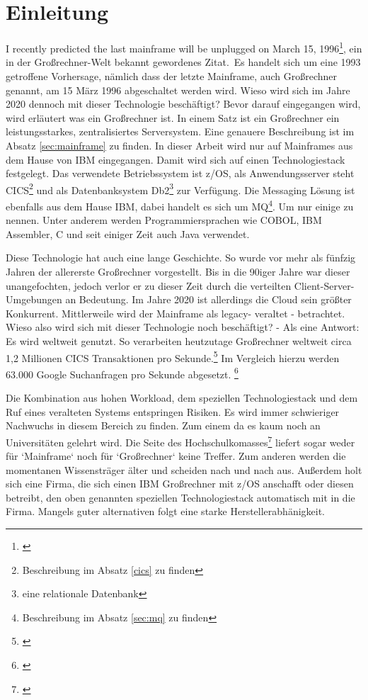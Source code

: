 \chapter{Einleitung}\label{ch:einleitung}
\glqq I recently predicted the last mainframe will be unplugged on March 15, 1996\grqq \footnote{\cite{Alsop.1993}}, ein in der Großrechner-Welt bekannt gewordenes Zitat.\
Es handelt sich um eine 1993 getroffene Vorhersage, nämlich dass der letzte Mainframe, auch Großrechner genannt, am 15 März 1996 abgeschaltet werden wird.
Wieso wird sich im Jahre 2020 dennoch mit dieser Technologie beschäftigt?
Bevor darauf eingegangen wird, wird erläutert was ein Großrechner ist.
In einem Satz ist ein Großrechner ein leistungsstarkes, zentralisiertes Serversystem.
Eine genauere Beschreibung ist im Absatz \ref{sec:mainframe} zu finden.
In dieser Arbeit wird nur auf Mainframes aus dem Hause von IBM eingegangen.
Damit wird sich auf einen Technologiestack festgelegt.
Das verwendete Betriebssystem ist z/OS, als Anwendungsserver steht CICS\footnote{Beschreibung im Absatz \ref{cics} zu finden} und als Datenbanksystem Db2\footnote{eine relationale Datenbank} zur Verfügung.
Die Messaging Lösung ist ebenfalls aus dem Hause IBM, dabei handelt es sich um MQ\footnote{Beschreibung im Absatz \ref{sec:mq} zu finden}.
Um nur einige zu nennen.
Unter anderem werden Programmiersprachen wie COBOL, IBM Assembler, C und seit einiger Zeit auch Java verwendet.

Diese Technologie hat auch eine lange Geschichte.
So wurde vor mehr als fünfzig Jahren der allererste Großrechner vorgestellt.
Bis in die 90iger Jahre war dieser unangefochten, jedoch verlor er zu dieser Zeit durch die verteilten Client-Server-Umgebungen an Bedeutung.
Im Jahre 2020 ist allerdings die Cloud sein größter Konkurrent.
Mittlerweile wird der Mainframe als \glqq  legacy\grqq{}- veraltet - betrachtet.
Wieso also wird sich mit dieser Technologie noch beschäftigt? - Als eine Antwort: Es wird weltweit genutzt.
So verarbeiten heutzutage Großrechner weltweit circa 1,2 Millionen CICS Transaktionen pro Sekunde.\footnote{\cite{IBM.2019}}
Im Vergleich hierzu werden 63.000 Google Suchanfragen pro Sekunde abgesetzt. \footnote{\cite{Sullivan.2016}}

Die Kombination aus hohen Workload, dem speziellen Technologiestack und dem Ruf eines veralteten Systems entspringen Risiken.
Es wird immer schwieriger Nachwuchs in diesem Bereich zu finden.
Zum einem da es kaum noch an Universitäten gelehrt wird.
Die Seite des Hochschulkomasses\footnote{\cite{internetagenturKolnFrankfurtsunzinetTYPO3Programmmierung.}} liefert sogar weder für `Mainframe` noch für `Großrechner` keine Treffer.
Zum anderen werden die momentanen Wissensträger älter und scheiden nach und nach aus.
Außerdem holt sich eine Firma, die sich einen IBM Großrechner mit z/OS anschafft oder diesen betreibt, den oben genannten speziellen Technologiestack automatisch mit in die Firma.
Mangels guter alternativen folgt eine starke Herstellerabhänigkeit.

